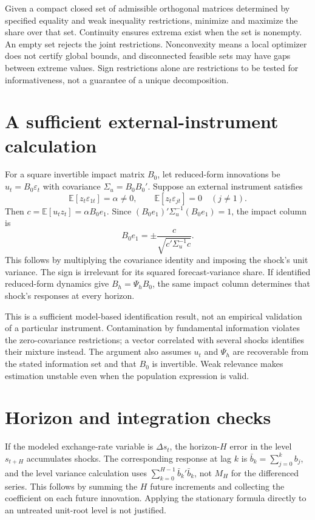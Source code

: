 \documentclass[11pt]{article}
\newcommand{\E}{\mathbb E}
\begin{document}
Given a compact closed set of admissible orthogonal matrices determined by specified equality and weak inequality restrictions, minimize and maximize the share over that set. Continuity ensures extrema exist when the set is nonempty. An empty set rejects the joint restrictions. Nonconvexity means a local optimizer does not certify global bounds, and disconnected feasible sets may have gaps between extreme values. Sign restrictions alone are restrictions to be tested for informativeness, not a guarantee of a unique decomposition.

\section*{A sufficient external-instrument calculation}
For a square invertible impact matrix $B_0$, let reduced-form innovations be $u_t=B_0\varepsilon_t$ with covariance $\Sigma_u=B_0B_0'$. Suppose an external instrument satisfies
\[
 \E[z_t\varepsilon_{1t}]=\alpha\ne0,\qquad
 \E[z_t\varepsilon_{jt}]=0\quad(j\ne1).
\]
Then $c=\E[u_tz_t]=\alpha B_0e_1$. Since
$(B_0e_1)'\Sigma_u^{-1}(B_0e_1)=1$,
the impact column is
\[
 B_0e_1=\pm\frac{c}{\sqrt{c'\Sigma_u^{-1}c}}.
\]
This follows by multiplying the covariance identity and imposing the shock's unit variance. The sign is irrelevant for its squared forecast-variance share. If identified reduced-form dynamics give $B_h=\Psi_hB_0$, the same impact column determines that shock's responses at every horizon.

This is a sufficient model-based identification result, not an empirical validation of a particular instrument. Contamination by fundamental information violates the zero-covariance restrictions; a vector correlated with several shocks identifies their mixture instead. The argument also assumes $u_t$ and $\Psi_h$ are recoverable from the stated information set and that $B_0$ is invertible. Weak relevance makes estimation unstable even when the population expression is valid.

\section*{Horizon and integration checks}
If the modeled exchange-rate variable is $\Delta s_t$, the horizon-$H$ error in the level $s_{t+H}$ accumulates shocks. The corresponding response at lag $k$ is
$\bar b_k=\sum_{j=0}^k b_j$,
and the level variance calculation uses $\sum_{k=0}^{H-1}\bar b_k'\bar b_k$, not $M_H$ for the differenced series. This follows by summing the $H$ future increments and collecting the coefficient on each future innovation. Applying the stationary formula directly to an untreated unit-root level is not justified.
\end{document}
